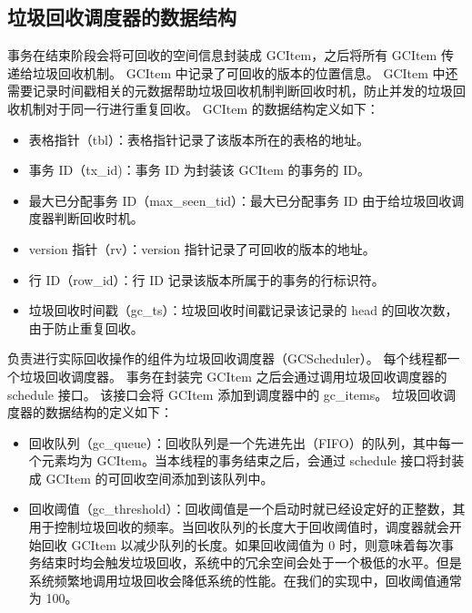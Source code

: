 \subsection{垃圾回收调度器的数据结构}
\label{ssec:gc-metadata}


事务在结束阶段会将可回收的空间信息封装成 GCItem，之后将所有 GCItem 传递给垃圾回收机制。
GCItem 中记录了可回收的版本的位置信息。
GCItem 中还需要记录时间戳相关的元数据帮助垃圾回收机制判断回收时机，防止并发的垃圾回收机制对于同一行进行重复回收。
GCItem 的数据结构定义如下：
\begin{itemize}
    \item 表格指针（tbl）：表格指针记录了该版本所在的表格的地址。
    \item 事务 ID（tx\_id)：事务 ID 为封装该 GCItem 的事务的 ID。
    \item 最大已分配事务 ID（max\_seen\_tid）：最大已分配事务 ID 由于给垃圾回收调度器判断回收时机。
    \item version 指针（rv）：version 指针记录了可回收的版本的地址。
    \item 行 ID（row\_id）：行 ID 记录该版本所属于的事务的行标识符。
    \item 垃圾回收时间戳（gc\_ts）：垃圾回收时间戳记录该记录的 head 的回收次数，由于防止重复回收。
\end{itemize}

负责进行实际回收操作的组件为垃圾回收调度器（GCScheduler）。
每个线程都一个垃圾回收调度器。
事务在封装完 GCItem 之后会通过调用垃圾回收调度器的 schedule 接口。
该接口会将 GCItem 添加到调度器中的 gc\_items。
垃圾回收调度器的数据结构的定义如下：
\begin{itemize}
    \item 回收队列（gc\_queue）：回收队列是一个先进先出（FIFO）的队列，其中每一个元素均为 GCItem。当本线程的事务结束之后，会通过 schedule 接口将封装成 GCItem 的可回收空间添加到该队列中。
    \item 回收阈值（gc\_threshold）：回收阈值是一个启动时就已经设定好的正整数，其用于控制垃圾回收的频率。当回收队列的长度大于回收阈值时，调度器就会开始回收 GCItem 以减少队列的长度。如果回收阈值为 0 时，则意味着每次事务结束时均会触发垃圾回收，系统中的冗余空间会处于一个极低的水平。但是系统频繁地调用垃圾回收会降低系统的性能。在我们的实现中，回收阈值通常为 100。
\end{itemize}



